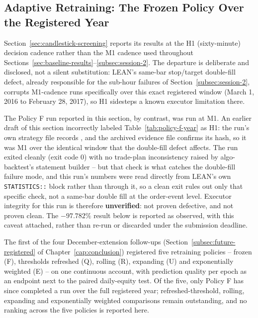 \subsection{Adaptive Retraining: The Frozen Policy Over the Registered Year} \label{sec:adaptive-retraining-results}

Section~\ref{sec:candlestick-screening} reports its results at the H1 (sixty-minute) decision cadence rather than the M1 cadence used throughout Sections~\ref{sec:baseline-results}--\ref{subsec:session-2}. The departure is deliberate and disclosed, not a silent substitution: LEAN's same-bar stop/target double-fill defect, already responsible for the sub-hour failures of Section~\ref{subsec:session-2}, corrupts M1-cadence runs specifically over this exact registered window (March 1, 2016 to February 28, 2017), so H1 sidesteps a known executor limitation there.

The Policy F run reported in this section, by contrast, was run at M1. An earlier draft of this section incorrectly labeled Table~\ref{tab:policy-f-year} as H1: the run's own strategy file records , and the archived evidence file  confirms its hash, so it was M1 over the identical window that the double-fill defect affects. The run exited cleanly (exit code 0) with no trade-plan inconsistency raised by algo-backtest's statement builder -- but that check is what catches the double-fill failure mode, and this run's numbers were read directly from LEAN's own \texttt{STATISTICS::} block rather than through it, so a clean exit rules out only that specific check, not a same-bar double fill at the order-event level. Executor integrity for this run is therefore \textbf{unverified}: not proven defective, and not proven clean. The $-97.782\%$ result below is reported as observed, with this caveat attached, rather than re-run or discarded under the submission deadline.

The first of the four December-extension follow-ups (Section~\ref{subsec:future-registered} of Chapter~\ref{cap:conclusion}) registered five retraining policies -- frozen (F), thresholds refreshed (Q), rolling (R), expanding (U) and exponentially weighted (E) -- on one continuous account, with prediction quality per epoch as an endpoint next to the paired daily-equity test. Of the five, only Policy F has since completed a run over the full registered year; refreshed-threshold, rolling, expanding and exponentially weighted comparisons remain outstanding, and no ranking across the five policies is reported here.

